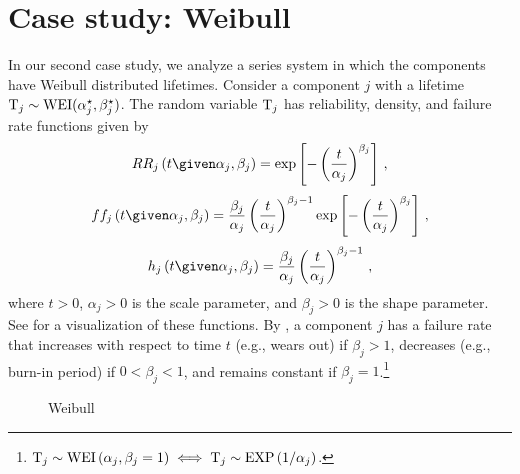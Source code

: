 \documentclass[../main.tex]{subfiles}
\begin{document}
\section{Case study: Weibull}
In our second case study, we analyze a series system in which the components have Weibull distributed lifetimes. Consider a component $j$ with a lifetime $\mathrm{T}_j \sim \text{WEI}({\alpha}^{\star}_j, {\beta}^{\star}_j)$. The random variable $\mathrm{T}_j$ has reliability, density, and failure rate functions given by
\begin{equation}
\label{eq:weibull_reliability}
\srv{R_j} \left(t \given \alpha_j, \beta_j \right) =
    \exp \left[-\left( \frac{t}{\alpha_j}\right)^{\beta_j} \right]\,,
\end{equation}
\begin{equation}
\label{eq:weibull_pdf}
\pdf{f_j}\left(t \given \alpha_j, \beta_j \right) =
    \frac{\beta_j}{\alpha_j}\left(\frac{t}{\alpha_j}\right)^{\beta_j-1} \exp \left [-\left(\frac{t}{\alpha_j}\right)^{\beta_j} \right ]\,,
\end{equation}
\begin{equation}
\label{eq:weibull_failure}
\haz_j\left(t \given \alpha_j, \beta_j \right) =
    \frac{\beta_j}{\alpha_j}\left(\frac{t}{\alpha_j}\right)^{\beta_j-1}\,,
\end{equation}
where $t > 0$, $\alpha_j > 0$ is the scale parameter, and $\beta_j > 0$ is the shape parameter. See  for a visualization of these functions. By , a component $j$ has a failure rate that increases with respect to time $t$ (e.g., wears out) if $\beta_j > 1$, decreases (e.g., burn-in period) if $0 < \beta_j < 1$, and remains constant if $\beta_j = 1$.\footnote{$\mathrm{T}_j \sim \text{WEI}\left(\alpha_j, \beta_j = 1\right) \iff \mathrm{T}_j \sim \text{EXP}\left(1/\alpha_j\right)$.}
\begin{figure}
    \caption{Weibull}
    \label{fig:weibull_series_functions}
    \centering
\end{figure}
\end{document}
